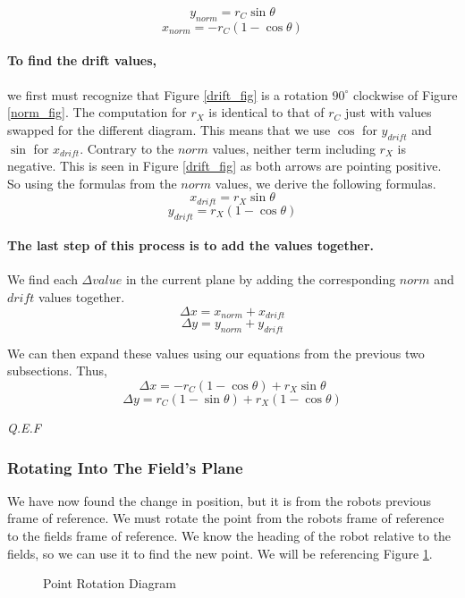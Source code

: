 \documentclass[12pt]{report}
\begin{document}
\centering
$$y_{norm} = r_C \sin\theta$$
$$x_{norm} = -r_C(1-\cos\theta)$$

\raggedright

\paragraph{To find the drift values,} we first must recognize that Figure \ref{drift_fig} is a rotation $90^{\circ}$ clockwise of Figure \ref{norm_fig}.
The computation for $r_X$ is identical to that of $r_C$ just with values swapped for the different diagram.
This means that we use $\cos$ for $y_{drift}$ and $\sin$ for $x_{drift}$. Contrary to the $norm$ values, neither term including $r_X$ is negative.
This is seen in Figure \ref{drift_fig} as both arrows are pointing positive.
So using the formulas from the $norm$ values, we derive the following formulas.
$$ x_{drift} = r_X \sin\theta$$
$$ y_{drift} = r_X (1-\cos\theta)$$

\paragraph{The last step of this process is to add the values together.} We find each $\Delta value$ in the current plane by adding the corresponding $norm$ and $drift$ values together.
$$ \Delta x = x_{norm} + x_{drift} $$
$$ \Delta y = y_{norm} + y_{drift} $$

We can then expand these values using our equations from the previous two subsections. Thus,
$$ \Delta x =  -r_C (1-\cos\theta) + r_X \sin\theta $$
$$ \Delta y =  r_C (1-\sin\theta) + r_X (1-\cos\theta) $$

\textit{Q.E.F}
\subsubsection{Rotating Into The Field's Plane}
We have now found the change in position, but it is from the robots previous frame of reference.
We must rotate the point from the robots frame of reference to the fields frame of reference. 
We know the heading of the robot relative to the fields, so we can use it to find the new point.
We will be referencing Figure \ref{FIG::PointRot}.
\begin{figure}
\caption{Point Rotation Diagram}
\label{FIG::PointRot}
\centering
{}
\end{figure}
\end{document}
